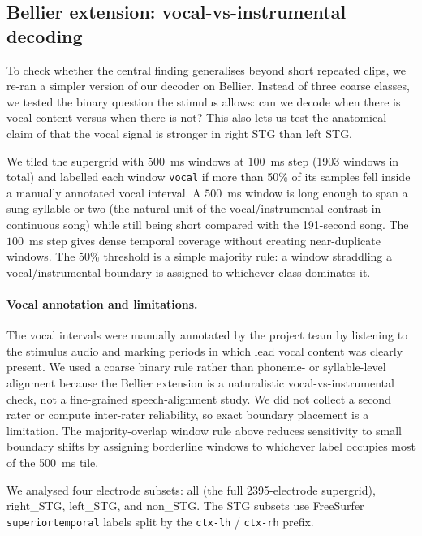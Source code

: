 \documentclass[11pt]{article}
\begin{document}
\subsection{Bellier extension: vocal-vs-instrumental decoding}\label{sec:methods:bellier}
To check whether the central finding generalises beyond short repeated clips, we re-ran a simpler version of our decoder on Bellier. Instead of three coarse classes, we tested the binary question the stimulus allows: can we decode when there is vocal content versus when there is not? This also lets us test the anatomical claim of \citet{Bellier2023} that the vocal signal is stronger in right STG than left STG.

We tiled the supergrid with $500$~ms windows at $100$~ms step (1903 windows in total) and labelled each window \texttt{vocal} if more than 50\% of its samples fell inside a manually annotated vocal interval. A $500$~ms window is long enough to span a sung syllable or two (the natural unit of the vocal/instrumental contrast in continuous song) while still being short compared with the 191-second song. The $100$~ms step gives dense temporal coverage without creating near-duplicate windows. The 50\% threshold is a simple majority rule: a window straddling a vocal/instrumental boundary is assigned to whichever class dominates it.

\paragraph{Vocal annotation and limitations.}
The vocal intervals were manually annotated by the project team by listening to the stimulus audio and marking periods in which lead vocal content was clearly present. We used a coarse binary rule rather than phoneme- or syllable-level alignment because the Bellier extension is a naturalistic vocal-vs-instrumental check, not a fine-grained speech-alignment study. We did not collect a second rater or compute inter-rater reliability, so exact boundary placement is a limitation. The majority-overlap window rule above reduces sensitivity to small boundary shifts by assigning borderline windows to whichever label occupies most of the 500~ms tile.

We analysed four electrode subsets: \textsf{all} (the full 2395-electrode supergrid), \textsf{right\_STG}, \textsf{left\_STG}, and \textsf{non\_STG}. The STG subsets use FreeSurfer \texttt{superiortemporal} labels split by the \texttt{ctx-lh} / \texttt{ctx-rh} prefix.
\end{document}
